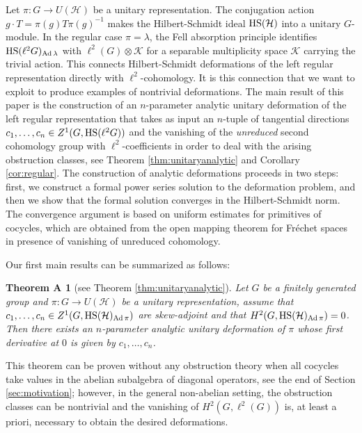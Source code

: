 \documentclass[12pt]{amsproc}
\theoremstyle{plain}
\newtheorem*{theoremA}{Theorem A}
\theoremstyle{definition}
\numberwithin{equation}{section}
\newcommand{\HS}{{\rm HS}}
\newcommand{\La}{\lambda}
\DeclareMathOperator{\Ad}{Ad}
\begin{document}
Let $\pi\colon G\to U(\mathcal H)$ be a unitary representation. The conjugation action
$
g\cdot T=\pi(g)T\pi(g)^{-1}
$
makes the Hilbert-Schmidt ideal $\HS(\mathcal H)$ into a unitary $G$-module. In the regular case $\pi=\La$, the Fell absorption principle identifies $\HS(\ell^2 G)_{\Ad\La}$ with $\ell^2(G)\otimes \mathcal K$ for a separable multiplicity space $\mathcal K$ carrying the trivial action. This connects Hilbert-Schmidt deformations of the left regular representation directly with $\ell^2$-cohomology. It is this connection that we want to exploit to produce examples of nontrivial deformations. The main result of this paper is the construction of an $n$-parameter analytic unitary deformation of the left regular representation that takes as input an $n$-tuple of tangential directions $c_1,\dots,c_n \in Z^1(G,\HS(\ell^2 G))$ and the vanishing of the \emph{unreduced} second cohomology group with $\ell^2$-coefficients in order to deal with the arising obstruction classes, see Theorem \ref{thm:unitaryanalytic} and Corollary \ref{cor:regular}. The construction of analytic deformations proceeds in two steps: first, we construct a formal power series solution to the deformation problem, and then we show that the formal solution converges in the Hilbert-Schmidt norm. The convergence argument is based on uniform estimates for primitives of cocycles, which are obtained from the open mapping theorem for Fr\'echet spaces in presence of vanishing of unreduced cohomology.

Our first main results can be summarized as follows:

\begin{theoremA}[see Theorem \ref{thm:unitaryanalytic}] Let $G$ be a finitely generated group and $\pi \colon G \to U(\mathcal H)$ be a unitary representation,
assume that $c_{1},\dots,c_{n}\in Z^1(G,\HS(\mathcal H)_{\Ad\pi})$ are skew-adjoint and that $H^2(G,\HS(\mathcal H)_{\Ad\pi})=0$.
Then there exists an $n$-parameter analytic unitary deformation of $\pi$ whose first derivative at $0$ is given by $c_1,\dots,c_n$.
\end{theoremA}

This theorem can be proven without any obstruction theory when all cocycles take values in the abelian subalgebra of diagonal operators, see the end of Section \ref{sec:motivation}; however, in the general non-abelian setting, the obstruction classes can be nontrivial and the vanishing of $H^2(G,\ell^2(G))$ is, at least a priori, necessary to obtain the desired deformations.
\end{document}
